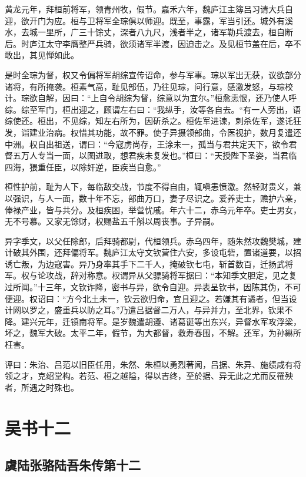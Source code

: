 \documentclass[12pt,UTF8]{ctexbook}
\begin{document}
黄龙元年，拜桓前将军，领青州牧，假节。嘉禾六年，魏庐江主簿吕习请大兵自迎，欲开门为应。桓与卫将军全琮俱以师迎。既至，事露，军当引还。城外有溪水，去城一里所，广三十馀丈，深者八九尺，浅者半之，诸军勒兵渡去，桓自断后。时庐江太守李膺整严兵骑，欲须诸军半渡，因迫击之。及见桓节盖在后，卒不敢出，其见惮如此。

是时全琮为督，权又令偏将军胡综宣传诏命，参与军事。琮以军出无获，议欲部分诸将，有所掩袭。桓素气高，耻见部伍，乃往见琮，问行意，感激发怒，与琮校计。琮欲自解，因曰：“上自令胡综为督，综意以为宜尔。”桓愈恚恨，还乃使人呼综。综至军门，桓出迎之，顾谓左右曰：“我纵手，汝等各自去。“有一人旁出，语综使还。桓出，不见综，知左右所为，因斫杀之。桓佐军进谏，刺杀佐军，遂讬狂发，诣建业治病。权惜其功能，故不罪。使子异摄领部曲，令医视护，数月复遣还中洲。权自出祖送，谓曰：“今寇虏尚存，王涂未一，孤当与君共定天下，欲令君督五万人专当一面，以图进取，想君疾未复发也。”桓曰：“天授陛下圣姿，当君临四海，猥重任臣，以除奸逆，臣疾当自愈。”

桓性护前，耻为人下，每临敌交战，节度不得自由，辄嗔恚愤激。然轻财贵义，兼以强识，与人一面，数十年不忘，部曲万口，妻子尽识之。爱养吏士，赡护六亲，俸禄产业，皆与共分。及桓疾困，举营忧戚。年六十二，赤乌元年卒。吏士男女，无不号慕。又家无馀财，权赐盐五千斛以周丧事。子异嗣。

异字季文，以父任除郎，后拜骑都尉，代桓领兵。赤乌四年，随朱然攻魏樊城，建计破其外围，还拜偏将军。魏庐江太守文钦营住六安，多设屯砦，置诸道要，以招诱亡叛，为边寇害。异乃身率其手下二千人，掩破钦七屯，斩首数百，迁扬武将军。权与论攻战，辞对称意。权谓异从父骠骑将军据曰：“本知季文胆定，见之复过所闻。”十三年，文钦诈降，密书与异，欲令自迎。异表呈钦书，因陈其伪，不可便迎。权诏曰：“方今北土未一，钦云欲归命，宜且迎之。若嫌其有谲者，但当设计网以罗之，盛重兵以防之耳。”乃遣吕据督二万人，与异并力，至北界，钦果不降。建兴元年，迁镇南将军。是岁魏遣胡遵、诸葛诞等出东兴，异督水军攻浮梁，坏之，魏军大破。太平二年，假节，为大都督，救寿春围，不解。还军，为孙綝所枉害。

评曰：朱治、吕范以旧臣任用，朱然、朱桓以勇烈著闻，吕据、朱异、施绩咸有将领之才，克绍堂构。若范、桓之越隘，得以吉终，至於据、异无此之尤而反罹殃者，所遇之时殊也。

\part{吴书十二}
\chapter{虞陆张骆陆吾朱传第十二}
\end{document}
